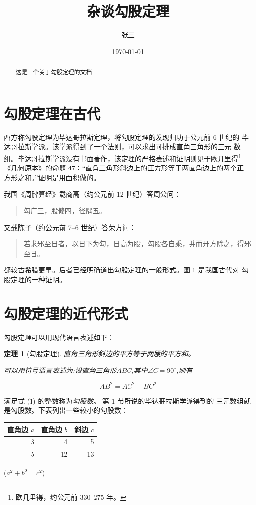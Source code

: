 \documentclass[UTF8,12pt]{ctexart}     %
\title{杂谈勾股定理}
\author{张三}
\date{\today}   %
\newtheorem{thm}{定理}
\numberwithin{thm}{section}
\begin{document}

\maketitle   %
\begin{abstract}
    这是一个关于勾股定理的文档
\end{abstract}
\tableofcontents   %
\section{勾股定理在古代}

西方称勾股定理为毕达哥拉斯定理，将勾股定理的发现归功于公元前 6 世纪的
毕达哥拉斯学派。该学派得到了一个法则，可以求出可排成直角三角形的三元
数组。毕达哥拉斯学派没有书面著作，该定理的严格表述和证明则见于欧几里得\footnote{欧几里得，约公元前 330--275 年。}
《几何原本》的命题 47：“直角三角形斜边上的正方形等于两直角边上的两个正
方形之和。”证明是用面积做的。

我国《周髀算经》载商高（约公元前 12 世纪）答周公问：
\begin{quote}
    \kaishu
    勾广三，股修四，径隅五。
\end{quote}

又载陈子（约公元前 7--6 世纪）答荣方问：
\begin{quote}
    \kaishu
    若求邪至日者，以日下为勾，日高为股，勾股各自乘，并而开方除之，得邪至日。
\end{quote}

都较古希腊更早。后者已经明确道出勾股定理的一般形式。图 1 是我国古代对
勾股定理的一种证明。

\section{勾股定理的近代形式}
勾股定理可以用现代语言表述如下：
\begin{thm}[勾股定理]
    直角三角形斜边的平方等于两腰的平方和。

    可以用符号语言表述为:设直角三角形$ABC$,其中$\angle C = 90^\circ$,则有

    \[
        AB^2 = AC^2 + BC^2
    \]

\end{thm}

满足式 (1) 的整数称为\emph{勾股数}。
第 1 节所说的毕达哥拉斯学派得到的
三元数组就是勾股数。下表列出一些较小的勾股数：
\begin{table}[H]
    \begin{tabular}{|r|r|r|}
        \hline
        直角边 $a$ & 直角边 $b$ & 斜边 $c$ \\
        \hline
        3       & 4       & 5      \\
        5       & 12      & 13     \\
        \hline
    \end{tabular}
    \qquad
    ($a^2 + b^2 = c^2$)
\end{table}
\end{document}
